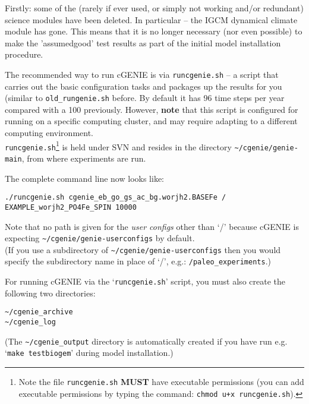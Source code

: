 \documentclass[10pt,twoside]{article}
\begin{document}
\begin{compactenum}

\item Firstly: some of the (rarely if ever used, or simply not working and/or redundant) science modules have been deleted. In particular -- the IGCM dynamical climate module has gone. This means that it is no longer necessary (nor even possible) to make the 'assumedgood' test results as part of the initial model installation procedure.

\item The recommended way to run cGENIE is via \texttt{runcgenie.sh} -- a script that carries out the basic configuration tasks and packages up the results for you (similar to \texttt{old\_rungenie.sh} before. By default it has 96 time steps per year compared with a 100 previously. However, \textbf{note} that this script is configured for running on a specific computing cluster, and may require adapting to a different computing environment.
\\ \texttt{runcgenie.sh}\footnote{Note the file \texttt{runcgenie.sh} \textbf{MUST} have executable permissions (you can add executable permissions by typing the command: \texttt{chmod u+x runcgenie.sh}).} is held under SVN and resides in the directory \texttt{\~{}/cgenie/genie-main}, from where experiments are run.
 
\item The complete command line now looks like:
\vspace{-5pt}\begin{verbatim}
./runcgenie.sh cgenie_eb_go_gs_ac_bg.worjh2.BASEFe / 
EXAMPLE_worjh2_PO4Fe_SPIN 10000
\end{verbatim}\vspace{-5pt}
  
Note that no path is given for the \textit{user configs} other than `/' because cGENIE is expecting \texttt{\~{}/cgenie/genie-userconfigs} by default.
\\(If you use a subdirectory of \texttt{\~{}/cgenie/genie-userconfigs} then you would specify the subdirectory name in place of `/', e.g.: \texttt{/paleo\_experiments}.)

\item For running cGENIE via the `\texttt{runcgenie.sh}' script, you must also create the following two directories:
\vspace{-5pt}\begin{verbatim}
~/cgenie_archive
~/cgenie_log
\end{verbatim}\vspace{-5pt}
(The \texttt{\~{}/cgenie\_output} directory is automatically created if you have run e.g. `\texttt{make testbiogem}' during model installation.)
 

\end{compactenum}
\end{document}
